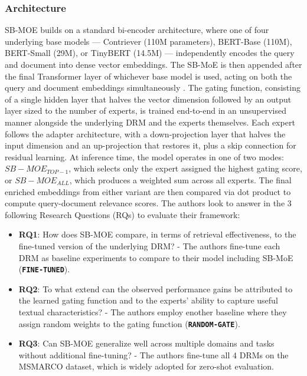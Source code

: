 \documentclass[a4paper,12pt]{article}
\begin{document}
\subsubsection{Architecture}
SB-MOE builds on a standard bi-encoder architecture, where one of four underlying base models — Contriever (110M parameters), BERT-Base (110M), BERT-Small (29M), or TinyBERT (14.5M) — independently encodes the query and document into dense vector embeddings. 
The SB-MoE is then appended after the final Transformer layer of whichever base model is used, acting on both the query and document embeddings simultaneously . The gating function, consisting of a single hidden layer that halves the vector dimension followed by an output layer
sized to the number of experts, is trained end-to-end in an unsupervised manner alongside the underlying DRM and the experts themselves. Each expert follows the adapter architecture, with a down-projection layer that halves the input dimension and an up-projection that restores it, plus a skip connection for residual learning. At inference time, the model operates in one of two modes:
$SB-MOE_{TOP-1}$, which selects only the expert assigned the highest gating score, or $SB-MOE_{ALL}$, which produces a weighted sum across all experts. The final enriched embeddings from either variant are then compared via dot product to compute query-document relevance scores. The authors look to answer in the 3 following Research Questions (RQs) to evaluate their framework:

\begin{itemize}
    \item{\textbf{RQ1}}: How does SB-MOE compare, in terms of retrieval effectiveness, to the fine-tuned version of the underlying DRM? - The authors fine-tune each DRM as baseline experiments to compare to their model including SB-MoE (\textbf{\texttt{FINE-TUNED}}).
    \item{\textbf{RQ2}}: To what extend can the observed performance gains be attributed to the learned gating function and to the experts’ ability to capture useful textual characteristics? - The authors employ enother baseline where they assign random weights to the gating function (\textbf{\texttt{RANDOM-GATE}}). 
    \item{\textbf{RQ3}}: Can SB-MOE generalize well across multiple domains and tasks without additional fine-tuning? - The authors fine-tune all 4 DRMs on the MSMARCO dataset, which is widely adopted for zero-shot evaluation.
\end{itemize}
\end{document}
